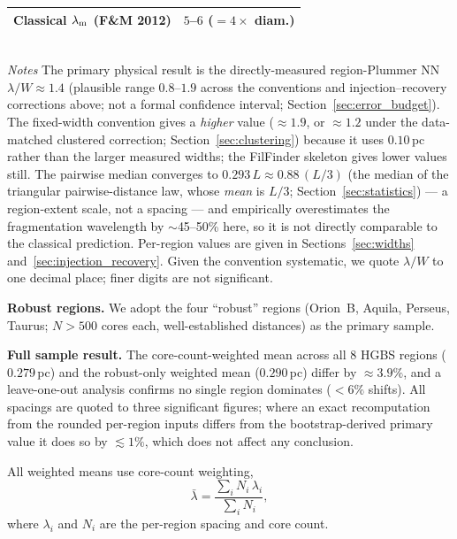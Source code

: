 \documentclass[usenatbib,twoside,twocolumn]{mnras}
\begin{document}
\begin{table}
\begin{tabular}{p{3.6cm}ccc}
Classical $\lambda_{\rm m}$ (F\&M 2012) & \multicolumn{3}{c}{$5$--$6$ ($=4\times$ diam.)} \\
\bottomrule
\end{tabular}
\\[2pt]
\footnotesize
\emph{Notes} The primary physical result is the directly-measured region-Plummer NN $\lambda/W\approx1.4$ (plausible range $0.8$--$1.9$ across the conventions and injection--recovery corrections above; not a formal confidence interval; Section~\ref{sec:error_budget}). The fixed-width convention gives a \emph{higher} value ($\approx1.9$, or $\approx1.2$ under the data-matched clustered correction; Section~\ref{sec:clustering}) because it uses $0.10$\,pc rather than the larger measured widths; the FilFinder skeleton gives lower values still. The pairwise median converges to $0.293\,L\approx0.88\,(L/3)$ (the median of the triangular pairwise-distance law, whose \emph{mean} is $L/3$; Section~\ref{sec:statistics}) --- a region-extent scale, not a spacing --- and empirically overestimates the fragmentation wavelength by $\sim$45--50\% here, so it is not directly comparable to the classical prediction. Per-region values are given in Sections~\ref{sec:widths} and~\ref{sec:injection_recovery}. Given the convention systematic, we quote $\lambda/W$ to one decimal place; finer digits are not significant.
\end{table}

\textbf{Robust regions.} We adopt the four ``robust'' regions (Orion~B, Aquila, Perseus, Taurus; $N>500$ cores each, well-established distances) as the primary sample.

\textbf{Full sample result.} The core-count-weighted mean across all 8 HGBS regions ($0.279$\,pc) and the robust-only weighted mean ($0.290$\,pc) differ by $\approx3.9\%$, and a leave-one-out analysis confirms no single region dominates ($<6\%$ shifts). All spacings are quoted to three significant figures; where an exact recomputation from the rounded per-region inputs differs from the bootstrap-derived primary value it does so by $\lesssim1\%$, which does not affect any conclusion.

All weighted means use core-count weighting,
\begin{equation}
\bar{\lambda} = \frac{\sum_i N_i\,\lambda_i}{\sum_i N_i},
\label{eq:weighting}
\end{equation}
where $\lambda_i$ and $N_i$ are the per-region spacing and core count.
\end{document}
